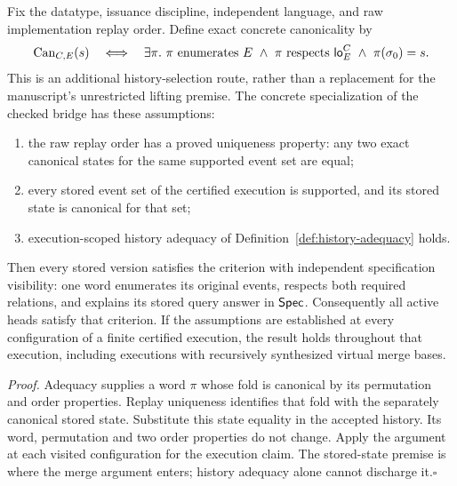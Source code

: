 \begin{theorem}\label{thm:history-bridge}
Fix the datatype, issuance discipline, independent language, and raw
implementation replay order. Define exact concrete canonicality by
\[
 \operatorname{Can}_{C,E}(s)\quad\Longleftrightarrow\quad
 \exists\pi.\ \pi\text{ enumerates }E\ \land\
 \pi\text{ respects }\mathsf{lo}^{C}_{E}\ \land\ \pi(\sigma_0)=s.
\]
This is an additional history-selection route, rather than a replacement for
the manuscript's unrestricted lifting premise. The concrete specialization
of the checked bridge has these assumptions:
\begin{enumerate}[nosep]
 \item the raw replay order has a proved uniqueness property: any two
       exact canonical states for the same supported event set are equal;
 \item every stored event set of the certified execution is supported, and its
       stored state is canonical for that set;
 \item execution-scoped history adequacy of
       Definition~\ref{def:history-adequacy} holds.
\end{enumerate}
Then every stored version satisfies the criterion with independent
specification visibility: one word enumerates its original events, respects
both required relations, and explains its stored query answer in $\mathsf{Spec}$.
Consequently all active heads satisfy that criterion. If the assumptions are
established at every configuration of a finite certified execution, the result
holds throughout that execution, including executions with recursively
synthesized virtual merge bases.
\end{theorem}

\noindent\emph{Proof.}
Adequacy supplies a word $\pi$ whose fold is canonical by its permutation and
order properties. Replay uniqueness identifies that fold with
the separately canonical stored state. Substitute this state equality in the
accepted history. Its word, permutation and two order properties do not change.
Apply the argument at each visited configuration for the execution claim.
The stored-state premise is where the merge argument enters; history adequacy
alone cannot discharge it.\hfill$\square$

